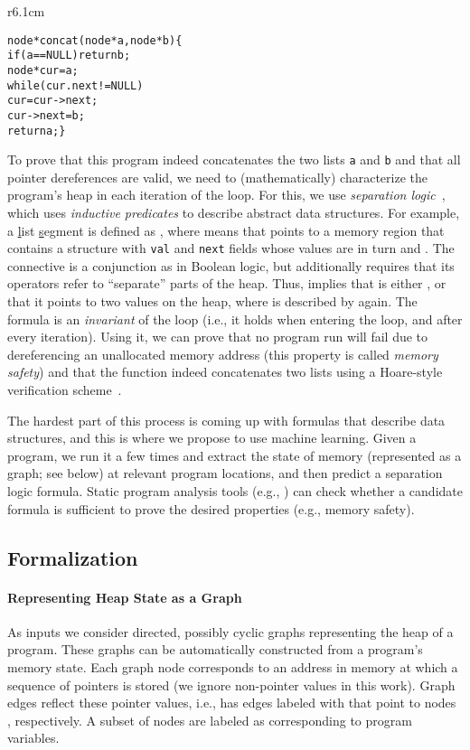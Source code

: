 \documentclass{article} \usepackage{iclr2016_conference,times}
\begin{document}
\begin{wrapfigure}[7]{r}{6.1cm}
\small\vspace{-2ex}
\begin{alltt}
node* concat(node* a, node* b) \{
  if (a == NULL) return b;
  node* cur = a;
  while (cur.next != NULL)
    cur = cur->next;
  cur->next = b;
  return a; \hfill\}
\end{alltt}
\end{wrapfigure}
To prove that this program indeed concatenates the two lists \texttt{a} and
\texttt{b} and that all pointer dereferences are valid, we need to
(mathematically) characterize the program's heap in each iteration of the loop.
For this, we use \emph{separation logic}~\citep{OHearn01,Reynolds02}, which uses
\emph{inductive predicates} to describe abstract data structures.
For example, a \underline{l}ist \underline{s}egment is defined as , where  means
that  points to a memory region that contains a structure with \texttt{val}
and \texttt{next} fields whose values are in turn  and .
The  connective is a conjunction as  in Boolean logic, but
additionally requires that its operators refer to ``separate'' parts of the
heap.
Thus,  implies that  is either
, or that it points to two values  on the heap, where 
is described by  again.
The formula  is an
\emph{invariant} of the loop (i.e., it holds when entering the loop, and
after every iteration).
Using it, we can prove that no program run will fail due to dereferencing an
unallocated memory address (this property is called \emph{memory safety}) and
that the function indeed concatenates two lists using a Hoare-style verification
scheme~\citep{Hoare69}.

The hardest part of this process is coming up with formulas that describe
data structures, and this is where we propose to use machine
learning.  Given a program, we run it a few times and
extract the state of memory (represented as a graph; see below) at relevant program locations,
and then predict a separation logic formula.
Static program analysis tools (e.g., \citep{Piskac14}) can check whether a
candidate formula is sufficient to prove the desired properties (e.g., memory
safety).

\subsection{Formalization}

\paragraph{Representing Heap State as a Graph}
As inputs we consider directed, possibly cyclic graphs representing the heap of
a program. These graphs can be automatically constructed from a program's memory
state.
Each graph node  corresponds to an address in memory at which a
sequence of pointers  is stored (we ignore
non-pointer values in this work).
Graph edges reflect these pointer values, i.e.,  has edges 
labeled with   that point to nodes , respectively.
A subset of nodes are labeled as corresponding to program variables.
\end{document}
